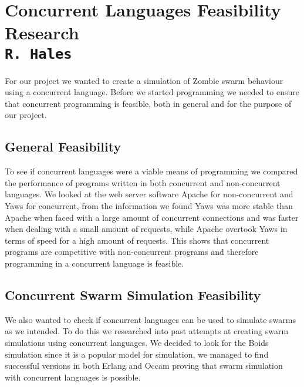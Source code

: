 \pagestyle{empty}
\section{Concurrent Languages Feasibility Research\\{\small\tt R.~Hales}}
For our project we wanted to create a simulation of Zombie swarm behaviour using a concurrent language. Before we started programming we needed to ensure that concurrent programming is  feasible, both in general and for the purpose of our project.

\subsection{General Feasibility}
To see if concurrent languages were a viable means of programming we compared the performance of programs written in both concurrent and non-concurrent languages. We looked at the web server software Apache for non-concurrent and Yaws for concurrent, from the information we found Yaws was more stable than Apache when faced with a large amount of concurrent connections and was faster when dealing with a small amount of requests, while Apache overtook Yaws in terms of speed for a high amount of requests. This shows that concurrent programs are competitive with non-concurrent programs and therefore programming in a concurrent language is feasible.

\subsection{Concurrent Swarm Simulation Feasibility}
We also wanted to check if concurrent languages can be used to simulate swarms as we intended. To do this we researched into past attempts at creating swarm simulations using concurrent languages. We decided to look for the Boids simulation since it is a popular model for simulation, we managed to find successful versions in both Erlang and Occam proving that swarm simulation with concurrent languages is possible.
\clearpage
\endinput
